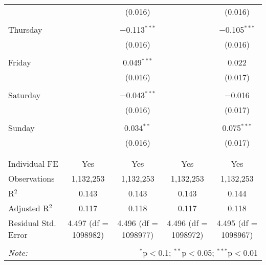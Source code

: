 \documentclass[
]{article}
\begin{document}
\begin{table}[!htbp]
{\begin{tabular}{@{\extracolsep{5pt}}lcccc}
  &  & (0.016) &  & (0.016) \\ 
  & & & & \\ 
 Thursday &  & $-$0.113$^{***}$ &  & $-$0.105$^{***}$ \\ 
  &  & (0.016) &  & (0.016) \\ 
  & & & & \\ 
 Friday &  & 0.049$^{***}$ &  & 0.022 \\ 
  &  & (0.016) &  & (0.017) \\ 
  & & & & \\ 
 Saturday &  & $-$0.043$^{***}$ &  & $-$0.016 \\ 
  &  & (0.016) &  & (0.017) \\ 
  & & & & \\ 
 Sunday &  & 0.034$^{**}$ &  & 0.075$^{***}$ \\ 
  &  & (0.016) &  & (0.017) \\ 
  & & & & \\ 
\hline \\[-1.8ex] 
Individual FE & Yes & Yes & Yes & Yes \\ 
Observations & 1,132,253 & 1,132,253 & 1,132,253 & 1,132,253 \\ 
R$^{2}$ & 0.143 & 0.143 & 0.143 & 0.144 \\ 
Adjusted R$^{2}$ & 0.117 & 0.118 & 0.117 & 0.118 \\ 
Residual Std. Error & 4.497 (df = 1098982) & 4.496 (df = 1098977) & 4.496 (df = 1098972) & 4.495 (df = 1098967) \\ 
\hline 
\hline \\[-1.8ex] 
\textit{Note:}  & \multicolumn{4}{r}{$^{*}$p$<$0.1; $^{**}$p$<$0.05; $^{***}$p$<$0.01} \\ 
\end{tabular}
} 
\end{table}
\end{document}
